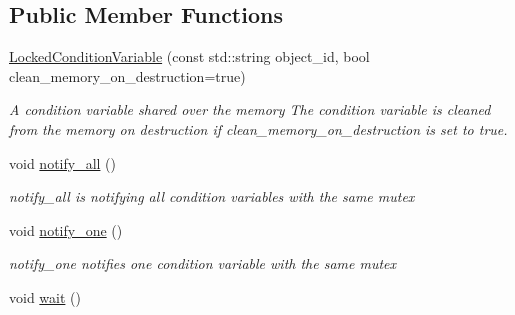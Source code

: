 \subsection*{Public Member Functions}
\begin{DoxyCompactItemize}
\item 
\hyperlink{classshared__memory_1_1LockedConditionVariable_a648057022bbf8a7b5221e1170b1e099c}{Locked\+Condition\+Variable} (const std\+::string object\+\_\+id, bool clean\+\_\+memory\+\_\+on\+\_\+destruction=true)
\begin{DoxyCompactList}\small\item\em A condition variable shared over the memory The condition variable is cleaned from the memory on destruction if clean\+\_\+memory\+\_\+on\+\_\+destruction is set to true. \end{DoxyCompactList}\item 
void \hyperlink{classshared__memory_1_1LockedConditionVariable_a31633f2243b988dc0a8bd3d4637dc216}{notify\+\_\+all} ()\hypertarget{classshared__memory_1_1LockedConditionVariable_a31633f2243b988dc0a8bd3d4637dc216}{}\label{classshared__memory_1_1LockedConditionVariable_a31633f2243b988dc0a8bd3d4637dc216}

\begin{DoxyCompactList}\small\item\em notify\+\_\+all is notifying all condition variables with the same mutex \end{DoxyCompactList}\item 
void \hyperlink{classshared__memory_1_1LockedConditionVariable_a532a1332fe184e668a49fa002db5be08}{notify\+\_\+one} ()\hypertarget{classshared__memory_1_1LockedConditionVariable_a532a1332fe184e668a49fa002db5be08}{}\label{classshared__memory_1_1LockedConditionVariable_a532a1332fe184e668a49fa002db5be08}

\begin{DoxyCompactList}\small\item\em notify\+\_\+one notifies one condition variable with the same mutex \end{DoxyCompactList}\item 
void \hyperlink{classshared__memory_1_1LockedConditionVariable_a9eb84ab5d570a0c5a81f6eaeb4c4dd50}{wait} ()\hypertarget{classshared__memory_1_1LockedConditionVariable_a9eb84ab5d570a0c5a81f6eaeb4c4dd50}{}\label{classshared__memory_1_1LockedConditionVariable_a9eb84ab5d570a0c5a81f6eaeb4c4dd50}


\end{DoxyCompactItemize}
